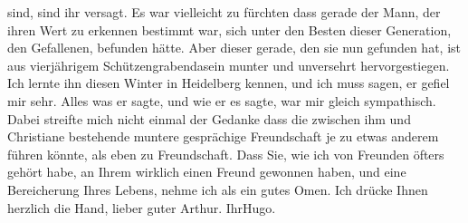 \begin{ledgroupsized}[t]{13cm}
               sind, sind ihr versagt. Es war vielleicht zu fürchten dass gerade der Mann, der ihren
               Wert zu erkennen bestimmt war, sich unter den Besten dieser Generation, den
               Gefallenen, befunden hätte. Aber dieser gerade, den sie nun gefunden hat, ist aus vierjährigem
               Schützengrabendasein munter und unversehrt hervorgestiegen.\pend
           \pstart
           Ich lernte ihn diesen Winter in Heidelberg kennen, und ich muss sagen, er gefiel mir sehr. Alles was er
               sagte, und wie er es sagte, war mir gleich sympathisch. Dabei streifte mich nicht
               einmal der Gedanke dass die {\pb}zwischen ihm und Christiane bestehende
               muntere gesprächige Freundschaft je zu etwas anderem führen könnte, als eben zu
               Freundschaft.\pend
           \pstart
           Dass Sie, wie ich von Freunden öfters gehört habe, an Ihrem \label{K_L02503-4v}\label{K_L02503-4h} wirklich einen Freund
               gewonnen haben, und eine Bereicherung Ihres Lebens, nehme ich als ein gutes Omen.\pend
           \pstart
           Ich drücke Ihnen herzlich die Hand, lieber guter Arthur.\pend
           \pstart Ihr\spacefill\mbox{Hugo.}\pend{}
         
         \endnumbering{}\end{ledgroupsized}  \newcommand{\dateiname}{L02503}\newcommand{\titel}{Hugo Hofmannsthal an Arthur Schnitzler, 10. 7. [1928]}\newcommand{\editorInnen}{Martin Anton Müller und Gerd-Hermann Susen}
      